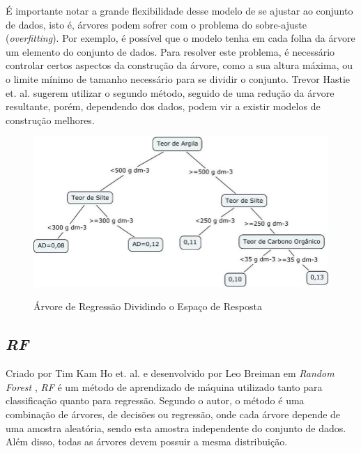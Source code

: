 É importante notar a grande flexibilidade desse modelo de se ajustar ao conjunto de dados, isto é, árvores podem sofrer com o problema do sobre-ajuste (\textit{overfitting}). Por exemplo, é possível que o modelo tenha em cada folha da árvore um elemento do conjunto de dados. Para resolver este problema, é necessário controlar certos aspectos da construção da árvore, como a sua altura máxima, ou o limite mínimo de tamanho necessário para se dividir o conjunto. Trevor Hastie et. al. \cite{hastie2005elements} sugerem utilizar o segundo método, seguido de uma redução da árvore resultante, porém, dependendo dos dados, podem vir a existir modelos de construção melhores.
 
 \begin{figure}[htbp]
    \centering
    \includegraphics[scale=0.6]{monography/img/models/regression_tree.png}
    \label{figure:tree}
    \caption[Árvore de Regressão Dividindo o Espaço de Resposta]{Árvore de Regressão Dividindo o Espaço de Resposta\footnotemark}
\end{figure}


\subsection{\textit{\acrfull{RF}}}

Criado por Tim Kam Ho et. al. \cite{ho_1995} e desenvolvido por Leo Breiman em \textit{Random Forest} \cite{Breiman:2001:RF:570181.570182}, \textit{\acrshort{RF}} é um método de aprendizado de máquina utilizado tanto para classificação quanto para regressão. Segundo o autor, o método é uma combinação de árvores, de decisões ou regressão, onde cada árvore depende de uma amostra aleatória, sendo esta amostra independente do conjunto de dados. Além disso, todas as árvores devem possuir a mesma distribuição. 

